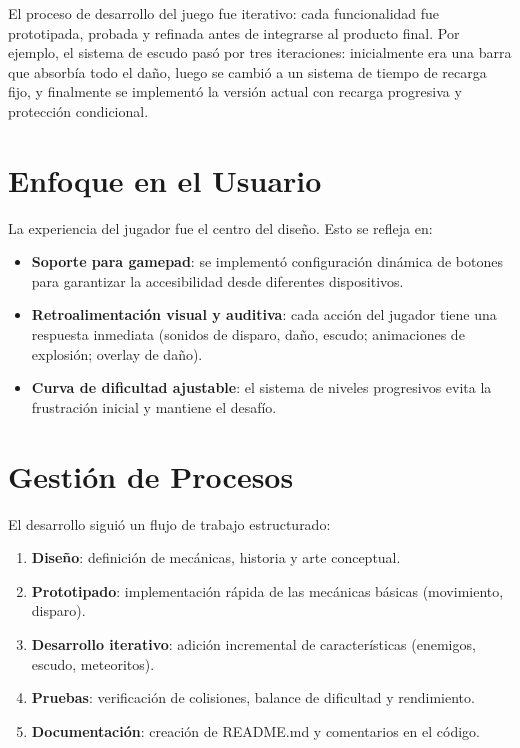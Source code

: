 \documentclass[12pt, a4paper, oneside]{report}
\begin{document}
El proceso de desarrollo del juego fue iterativo: cada funcionalidad fue prototipada, probada y refinada antes de integrarse al producto final. Por ejemplo, el sistema de escudo pasó por tres iteraciones: inicialmente era una barra que absorbía todo el daño, luego se cambió a un sistema de tiempo de recarga fijo, y finalmente se implementó la versión actual con recarga progresiva y protección condicional.

\section{Enfoque en el Usuario}

La experiencia del jugador fue el centro del diseño. Esto se refleja en:
\begin{itemize}
    \item \textbf{Soporte para gamepad}: se implementó configuración dinámica de botones para garantizar la accesibilidad desde diferentes dispositivos.
    \item \textbf{Retroalimentación visual y auditiva}: cada acción del jugador tiene una respuesta inmediata (sonidos de disparo, daño, escudo; animaciones de explosión; overlay de daño).
    \item \textbf{Curva de dificultad ajustable}: el sistema de niveles progresivos evita la frustración inicial y mantiene el desafío.
\end{itemize}

\section{Gestión de Procesos}

El desarrollo siguió un flujo de trabajo estructurado:
\begin{enumerate}
    \item \textbf{Diseño}: definición de mecánicas, historia y arte conceptual.
    \item \textbf{Prototipado}: implementación rápida de las mecánicas básicas (movimiento, disparo).
    \item \textbf{Desarrollo iterativo}: adición incremental de características (enemigos, escudo, meteoritos).
    \item \textbf{Pruebas}: verificación de colisiones, balance de dificultad y rendimiento.
    \item \textbf{Documentación}: creación de README.md y comentarios en el código.
\end{enumerate}
\end{document}
